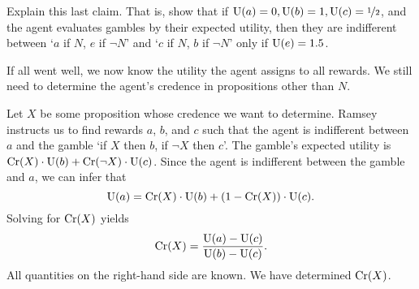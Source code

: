 \begin{exercise}{1}
  Explain this last claim. That is, show that if
  $\text{U}(a)=0, \text{U}(b)=1, \text{U}(c)=\nicefrac{1}{2}$, and the agent evaluates gambles by
  their expected utility, then they are indifferent between `$a$ if $N$, $e$ if
  $\neg N$' and `$c$ if $N$, $b$ if $\neg N$' only if $\text{U}(e) = 1.5$.
\end{exercise}



If all went well, we now know the utility the agent assigns to all rewards. We
still need to determine the agent's credence in propositions other than $N$.

Let $X$ be some proposition whose credence we want to determine. Ramsey
instructs us to find rewards $a$, $b$, and $c$ such that the agent is
indifferent between $a$ and the gamble `if $X$ then $b$, if $\neg X$ then $c$'.
The gamble's expected utility is $\text{Cr}(X) \cdot \text{U}(b) + \text{Cr}(\neg X) \cdot \text{U}(c)$.
Since the agent is indifferent between the gamble and $a$, we can infer that
\[
  \text{U}(a) = \text{Cr}(X)\cdot \text{U}(b) + (1-\text{Cr}(X))\cdot \text{U}(c).
\]
Solving for $\text{Cr}(X)$ yields
\[
  \text{Cr}(X) = \frac{\text{U}(a) - \text{U}(c)}{\text{U}(b) - \text{U}(c)}.
\]
All quantities on the right-hand side are known. We have determined $\text{Cr}(X)$.

